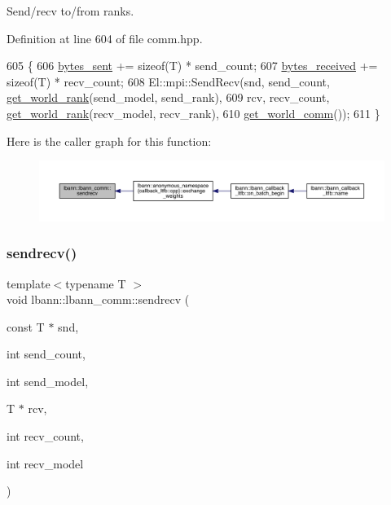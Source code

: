 Send/recv to/from ranks. 

Definition at line 604 of file comm.\+hpp.


\begin{DoxyCode}
605                                                                        \{
606     \hyperlink{classlbann_1_1lbann__comm_ad1f146ae7337ece6266fd307944928e0}{bytes\_sent} += \textcolor{keyword}{sizeof}(T) * send\_count;
607     \hyperlink{classlbann_1_1lbann__comm_afb99f57f7eafc0695bf28e6c26a8120f}{bytes\_received} += \textcolor{keyword}{sizeof}(T) * recv\_count;
608     El::mpi::SendRecv(snd, send\_count, \hyperlink{classlbann_1_1lbann__comm_ab3b1ebe8b72575094405eb2e37bb447d}{get\_world\_rank}(send\_model, send\_rank),
609                       rcv, recv\_count, \hyperlink{classlbann_1_1lbann__comm_ab3b1ebe8b72575094405eb2e37bb447d}{get\_world\_rank}(recv\_model, recv\_rank),
610                       \hyperlink{classlbann_1_1lbann__comm_a0493f1f0c42b95674daacf5288fdb073}{get\_world\_comm}());
611   \}
\end{DoxyCode}
Here is the caller graph for this function\+:\nopagebreak
\begin{figure}[H]
\begin{center}
\leavevmode
\includegraphics[width=350pt]{classlbann_1_1lbann__comm_a6314e3b07b21b8fb0cd2ebe1e49dddb9_icgraph}
\end{center}
\end{figure}
\mbox{\label{classlbann_1_1lbann__comm_a61e8479f25d209be238f1b61115f7a0d}} 
\subsubsection{\texorpdfstring{sendrecv()}{sendrecv()}\hspace{0.1cm}{\footnotesize\ttfamily [2/2]}}
{\footnotesize\ttfamily template$<$typename T $>$ \\
void lbann\+::lbann\+\_\+comm\+::sendrecv (\begin{DoxyParamCaption}\item[{const T $\ast$}]{snd,  }\item[{int}]{send\+\_\+count,  }\item[{int}]{send\+\_\+model,  }\item[{T $\ast$}]{rcv,  }\item[{int}]{recv\+\_\+count,  }\item[{int}]{recv\+\_\+model }\end{DoxyParamCaption})\hspace{0.3cm}{\ttfamily [inline]}}



